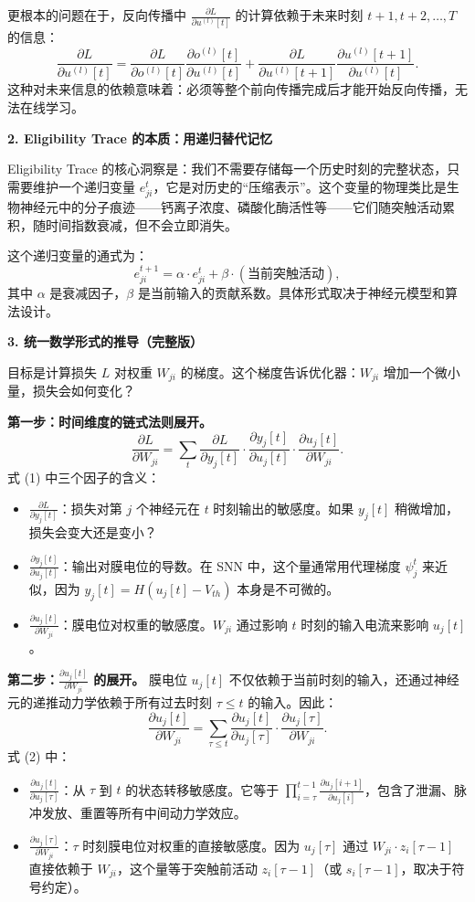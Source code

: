 \documentclass[journal,12pt,onecolumn]{IEEEtran}
\begin{document}
更根本的问题在于，反向传播中 $\frac{\partial L}{\partial u^{(l)}[t]}$ 的计算依赖于未来时刻 $t+1, t+2, \dots, T$ 的信息：
\[
\frac{\partial L}{\partial u^{(l)}[t]} = \frac{\partial L}{\partial o^{(l)}[t]}\frac{\partial o^{(l)}[t]}{\partial u^{(l)}[t]} + \frac{\partial L}{\partial u^{(l)}[t+1]}\frac{\partial u^{(l)}[t+1]}{\partial u^{(l)}[t]}.
\]
这种对未来信息的依赖意味着：必须等整个前向传播完成后才能开始反向传播，无法在线学习。

\medskip\noindent\textbf{2. Eligibility Trace 的本质：用递归替代记忆}

Eligibility Trace 的核心洞察是：我们不需要存储每一个历史时刻的完整状态，只需要维护一个递归变量 $e_{ji}^t$，它是对历史的“压缩表示”。这个变量的物理类比是生物神经元中的分子痕迹——钙离子浓度、磷酸化酶活性等——它们随突触活动累积，随时间指数衰减，但不会立即消失。

这个递归变量的通式为：
\[
e_{ji}^{t+1} = \alpha \cdot e_{ji}^t + \beta \cdot (\text{当前突触活动}),
\]
其中 $\alpha$ 是衰减因子，$\beta$ 是当前输入的贡献系数。具体形式取决于神经元模型和算法设计。

\medskip\noindent\textbf{3. 统一数学形式的推导（完整版）}

目标是计算损失 $L$ 对权重 $W_{ji}$ 的梯度。这个梯度告诉优化器：$W_{ji}$ 增加一个微小量，损失会如何变化？

\textbf{第一步：时间维度的链式法则展开。}
\[
\frac{\partial L}{\partial W_{ji}} = \sum_{t} \frac{\partial L}{\partial y_j[t]} \cdot \frac{\partial y_j[t]}{\partial u_j[t]} \cdot \frac{\partial u_j[t]}{\partial W_{ji}}. \tag{1}
\]
式 (1) 中三个因子的含义：
\begin{itemize}
    \item $\frac{\partial L}{\partial y_j[t]}$：损失对第 $j$ 个神经元在 $t$ 时刻输出的敏感度。如果 $y_j[t]$ 稍微增加，损失会变大还是变小？
    \item $\frac{\partial y_j[t]}{\partial u_j[t]}$：输出对膜电位的导数。在 SNN 中，这个量通常用代理梯度 $\psi_j^t$ 来近似，因为 $y_j[t] = H(u_j[t] - V_{th})$ 本身是不可微的。
    \item $\frac{\partial u_j[t]}{\partial W_{ji}}$：膜电位对权重的敏感度。$W_{ji}$ 通过影响 $t$ 时刻的输入电流来影响 $u_j[t]$。
\end{itemize}

\textbf{第二步：$\frac{\partial u_j[t]}{\partial W_{ji}}$ 的展开。}
膜电位 $u_j[t]$ 不仅依赖于当前时刻的输入，还通过神经元的递推动力学依赖于所有过去时刻 $\tau \le t$ 的输入。因此：
\[
\frac{\partial u_j[t]}{\partial W_{ji}} = \sum_{\tau \le t} \frac{\partial u_j[t]}{\partial u_j[\tau]} \cdot \frac{\partial u_j[\tau]}{\partial W_{ji}}. \tag{2}
\]
式 (2) 中：
\begin{itemize}
    \item $\frac{\partial u_j[t]}{\partial u_j[\tau]}$：从 $\tau$ 到 $t$ 的状态转移敏感度。它等于 $\prod_{i=\tau}^{t-1} \frac{\partial u_j[i+1]}{\partial u_j[i]}$，包含了泄漏、脉冲发放、重置等所有中间动力学效应。
    \item $\frac{\partial u_j[\tau]}{\partial W_{ji}}$：$\tau$ 时刻膜电位对权重的直接敏感度。因为 $u_j[\tau]$ 通过 $W_{ji} \cdot z_i[\tau-1]$ 直接依赖于 $W_{ji}$，这个量等于突触前活动 $z_i[\tau-1]$（或 $s_i[\tau-1]$，取决于符号约定）。
\end{itemize}
\end{document}
